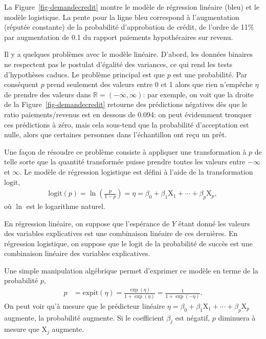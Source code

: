 \documentclass[
  11pt,
  letterpaper,
]{scrbook}
\theoremstyle{definition}
\theoremstyle{remark}
\begin{document}
La Figure~\ref{fig-demandecredit} montre le modèle de régression
linéaire (bleu) et le modèle logistique. La pente pour la ligne bleu
correspond à l'augmentation (réputée constante) de la probabilité
d'approbation de crédit, de l'ordre de 11\% par augmentation de 0.1 du
rapport paiements hypothécaires sur revenu.

Il y a quelques problèmes avec le modèle linéaire. D'abord, les données
binaires ne respectent pas le postulat d'égalité des variances, ce qui
rend les tests d'hypothèses caducs. Le problème principal est que \(p\)
est une probabilité. Par conséquent \(p\) prend seulement des valeurs
entre 0 et 1 alors que rien n'empêche \(\eta\) de prendre des valeurs
dans \(\mathbb{R}=(-\infty, \infty)\): par exemple, on voit que la
droite de la Figure~\ref{fig-demandecredit} retourne des prédictions
négatives dès que le ratio paiements/revenus est en dessous de 0.094: on
peut évidemment tronquer ces prédictions à zéro, mais cela sous-tend que
la probabilité d'acceptation est nulle, alors que certaines personnes
dans l'échantillon ont reçu un prêt.

Une façon de résoudre ce problème consiste à appliquer une
transformation à \(p\) de telle sorte que la quantité transformée puisse
prendre toutes les valeurs entre \(-\infty\) et \(\infty\). Le modèle de
régression logistique est défini à l'aide de la transformation
\(\textrm{logit}\), \begin{align*}
\textrm{logit}(p) = \ln\left( \frac{p}{1-p}\right)=\eta=\beta_0 + \beta_1\mathrm{X}_1 + \cdots + \beta_p \mathrm{X}_p,
\end{align*} où \(\ln\) est le logarithme naturel.

En régression linéaire, on suppose que l'espérance de \(Y\) étant donné
les valeurs des variables explicatives est une combinaison linéaire de
ces dernières. En régression logistique, on suppose que le logit de la
probabilité de succès est une combinaison linéaire des variables
explicatives.

Une simple manipulation algébrique permet d'exprimer ce modèle en terme
de la probabilité \(p\), \begin{align*}
 p &= \textrm{expit}(\eta) = \frac{\exp(\eta)}{1+\exp(\eta)}
= \frac{1}{1+\exp(-\eta)}.
\end{align*} On peut voir qu'à mesure que le prédicteur linéaire
\(\eta=\beta_0+\beta_1\mathrm{X}_1 + \cdots + \beta_p\mathrm{X}_p\)
augmente, la probabilité augmente. Si le coefficient \(\beta_j\) est
négatif, \(p\) diminuera à mesure que \(\mathrm{X}_j\) augmente.
\end{document}
